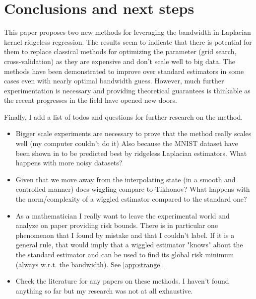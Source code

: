 \documentclass[12pt]{amsart}
\begin{document}
\section{Conclusions and next steps}

This paper proposes two new methods for leveraging the bandwidth in 
Laplacian kernel ridgeless regression.
The results seem to indicate that there is potential for them to replace
classical methods for optimizing the parameter (grid search, 
cross-validation) as they are expensive and don't scale well to big data.
The methods have been demonstrated to improve over standard estimators 
in some cases even with nearly optimal bandwidth guess.
However, much further experimentation is necessary and providing 
theoretical guarantees is thinkable as the recent progresses in the field 
have opened new doors.

Finally, I add a list of todos and questions for further research on 
the method.
\begin{itemize}
    \item Bigger scale experiments are necessary to prove that the method
        really scales well (my computer couldn't do it)
        Also because the MNIST dataset have been shown in \cite{justinterpolate} 
        to be predicted best by ridgeless Laplacian estimators.
        What happens with more noisy datasets?
    \item Given that we move away from the interpolating state 
        (in a smooth and controlled manner) does wiggling compare to 
        Tikhonov?
        What happens with the norm/complexity of a wiggled estimator
        compared to the standard one?
    \item As a mathematician I really want to leave the experimental world
        and analyze on paper providing risk bounds.
        There is in particular one phenomenon that I found by mistake and 
        that I couldn't label.
        If it is a general rule, that would imply that a wiggled estimator
        "knows" about the the standard estimator and can be used to find its 
        global risk minimum (always w.r.t. the bandwidth).
        See \cref{app:strange}.
    \item Check the literature for any papers on these
        methods. I haven't found anything so far but my research was not 
        at all exhaustive.
\end{itemize}
\end{document}
